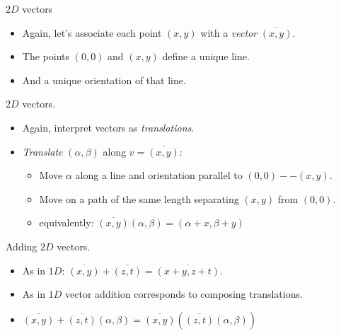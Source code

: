\documentclass{beamer}
\begin{document}
\begin{frame}{$2D$ vectors}
  \begin{itemize}
  \item Again, let's associate each point $(x,y)$ with a \emph{vector} $\overline {(x,y)}$.
  \item The points $(0,0)$ and $(x,y)$ define a unique line.
  \item And a unique orientation of that line.
  \end{itemize}

  \begin{center}
    
  \end{center}

\end{frame}

\begin{frame}{$2D$ vectors.}
  \begin{itemize}
  \item Again, interpret vectors as \emph{translations}.
  \item \emph{Translate} $(\alpha, \beta)$ along $v = \overline{(x, y)}$: 
    \begin{itemize}
    \item Move $\alpha$ along a line and orientation parallel to $(0,0) -- (x,y)$.
    \item Move on a path of the same length separating $(x, y)$ from $(0,0)$.
    \item equivalently: $\overline{(x,y)}(\alpha, \beta) = (\alpha + x, \beta + y)$
    \end{itemize}
  \end{itemize}
  
  \begin{center}
    
  \end{center}
  
\end{frame}

\begin{frame}{Adding $2D$ vectors.}
  \begin{itemize}
  \item As in $1D$: $\overline{(x, y)} + \overline{(z, t)} = \overline{(x + y, z + t)}.$
  \item As in $1D$ vector addition corresponds to composing translations.
  \item $\overline{(x, y)} + \overline{(z, t)}(\alpha, \beta) = \overline{(x, y)}(\overline{(z, t)}(\alpha, \beta))$
  \end{itemize}

  \begin{center}
    
  \end{center}
 
\end{frame}
\end{document}
